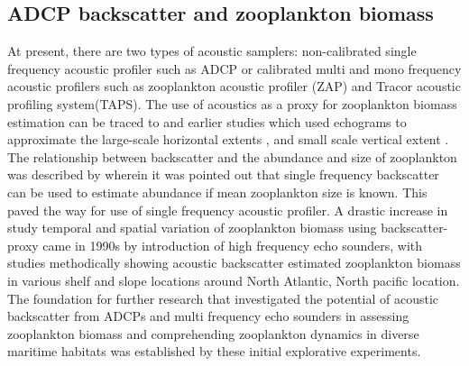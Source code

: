 \documentclass{article}
\begin{document}
	\subsection{ADCP backscatter and zooplankton biomass}
	At present, there are two types of acoustic samplers: non-calibrated single frequency acoustic profiler such as ADCP or calibrated multi and mono frequency acoustic profilers such as zooplankton acoustic profiler (ZAP) and Tracor acoustic profiling system(TAPS). The use of acoustics as a proxy for zooplankton biomass estimation can be traced to \citet{pieper1971study, sameoto1977use} and earlier studies which used echograms to approximate the large-scale horizontal extents \citep{barraclough1969shallow}, and small scale vertical extent \citep{mcnaught1968acoustical}. The relationship between backscatter and the abundance and size of zooplankton was described by \citet{greenlaw1979acoustical} 
	wherein it was pointed out that single frequency backscatter can be used to estimate abundance if mean zooplankton size is known. This paved the way for use of single frequency acoustic profiler. A drastic increase in study temporal and spatial variation of zooplankton biomass using  backscatter-proxy came in 1990s by introduction of high frequency echo sounders, with studies \citep{flagg1989use, wiebe1990sound, batchelder00981, greene1998three, rippeth1998diur} methodically showing acoustic backscatter estimated zooplankton biomass in various shelf and slope locations around  North Atlantic, North pacific location. The foundation for further research that investigated the potential of acoustic backscatter from ADCPs and multi frequency echo sounders in assessing zooplankton biomass and comprehending zooplankton dynamics in diverse maritime habitats was established by these initial explorative experiments.
	
\end{document}
